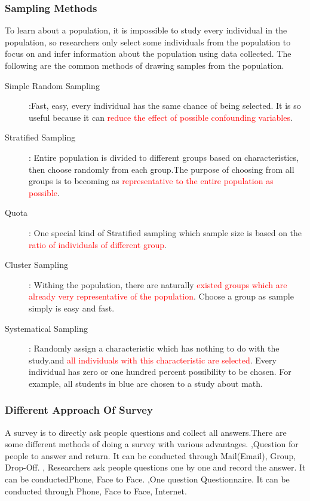 \subsubsection{Sampling Methods}  To learn about a population, it is impossible to study every individual in the population, so researchers only select some individuals from the population to focus on and infer information about the population using data collected. The following are the common methods of drawing samples from the population.
\begin{description}
    \item [Simple Random Sampling]:Fast, easy, every individual has the same chance of being selected. It is so useful because it can \textcolor{red}{reduce the effect of possible confounding variables}.  
    \item [Stratified Sampling]: Entire population is divided to different groups based on characteristics, then choose randomly from each group.The purpose of choosing from all groups is to becoming as \textcolor{red}{representative to the entire population as possible}.   
    \item [Quota]: One special kind of Stratified sampling which sample size is based on the \textcolor{red}{ratio of individuals of different group}.
    \item [Cluster Sampling]: Withing the population, there are naturally \textcolor{red}{existed groups which are already very representative of the population}. Choose a group as sample simply is easy and fast.
    \item [Systematical Sampling]: Randomly assign a characteristic which has nothing to do with the study.and \textcolor{red}{all individuals with this characteristic are selected}. Every individual has zero or one hundred percent possibility to be chosen. For example, all students in blue are chosen to a study about math.
 \end{description} 
 
 \subsubsection{Different Approach Of Survey}
A survey is to directly ask people questions and collect all answers.There are some different methods of doing a survey with various advantages.
,Question for people to answer and return. It can be conducted through Mail(Email), Group, Drop-Off.
, Researchers ask people questions one by one and record the answer. It can be conducted{Phone, Face to Face}.
,One question Questionnaire. It can be conducted through Phone, Face to Face, Internet.

